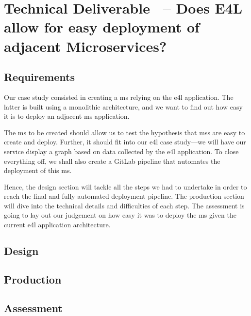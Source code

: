 \section{Technical Deliverable \thetdel\ -- Does E4L allow for easy
deployment of adjacent Microservices?}

\subsection{Requirements}

Our case study consisted in creating a \gls{ms} relying on the
\gls{e4l} application. The latter is built using a monolithic
architecture, and we want to find out how easy it is to deploy an
adjacent \gls{ms} application.

The \gls{ms} to be created should allow us to test the hypothesis that
\glspl{ms} are easy to create and deploy. Further, it should fit into
our \gls{e4l} case study---we will have our service display a graph
based on data collected by the \gls{e4l} application.  To close
everything off, we shall also create a GitLab pipeline that automates
the deployment of this \gls{ms}.

Hence, the design section will tackle all the steps we had to
undertake in order to reach the final and fully automated deployment
pipeline. The production section will dive into the technical details
and difficulties of each step. The assessment is going to lay out our
judgement on how easy it was to deploy the \gls{ms} given the current
\gls{e4l} application architecture.

\subsection{Design}


\subsection{Production}


\subsection{Assessment}

